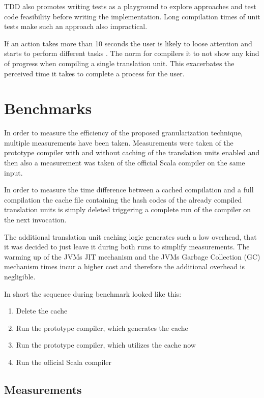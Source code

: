 \documentclass{VUMIFPSbakalaurinis}
\begin{document}
TDD also promotes writing tests as a playground to explore approaches and test code feasibility before writing the implementation.
Long compilation times of unit tests make such an approach also impractical.

If an action takes more than 10 seconds the user is likely to loose attention and starts to perform different tasks \cite{Usability}.
The norm for compilers it to not show any kind of progress when compiling a single translation unit.
This exacerbates the perceived time it takes to complete a process for the user\cite{Usability}.


\section{Benchmarks}
In order to measure the efficiency of the proposed granularization technique, multiple measurements have been taken.
Measurements were taken of the prototype compiler with and without caching of the translation units enabled and then also a measurement was taken of the official Scala compiler on the same input.

In order to measure the time difference between a cached compilation and a full compilation the cache file containing the hash codes of the already compiled translation units is simply deleted triggering a complete run of the compiler on the next invocation.

The additional translation unit caching logic generates such a low overhead, that it was decided to just leave it during both runs to simplify measurements.
The warming up of the JVMs JIT mechanism and the JVMs Garbage Collection (GC) mechanism times incur a higher cost and therefore the additional overhead is negligible.

In short the sequence during benchmark looked like this:

\begin{enumerate}
\item{Delete the cache}
\item{Run the prototype compiler, which generates the cache}
\item{Run the prototype compiler, which utilizes the cache now}
\item{Run the official Scala compiler}
\end{enumerate}

\subsection{Measurements}
\end{document}

